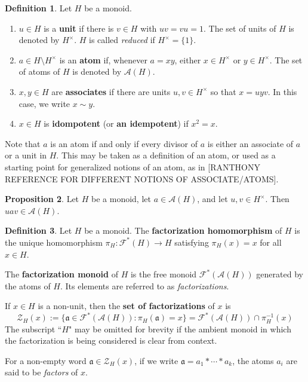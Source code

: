 \documentclass{report}
\newcommand{\A}{\mathscr{A}}
\renewcommand{\aa}{\mathfrak{a}}
\newcommand{\F}{\mathscr{F}}
\newcommand{\Z}{\mathcal{Z}}
\renewcommand{\:}{\text{:}}
\theoremstyle{definition}
\newtheorem{defn}{Definition}[section]
\newtheorem{prop}[defn]{Proposition}
\begin{document}
\begin{defn}
Let $H$ be a monoid.
\begin{enumerate}
\item $u\in H$ is a \textbf{unit} if there is $v\in H$ with $uv = vu = 1$.  
The set of units of $H$ is denoted by $H^\times$.  
$H$ is called \textit{reduced} if $H^\times = \{1\}$.
\item $a\in H\setminus H^\times$ is an \textbf{atom} if, whenever $a = xy$, either $x\in H^\times$ or $y\in H^\times$. The set of atoms of $H$ is denoted by $\A(H)$.
\item $x,y\in H$ are \textbf{associates} if there are units $u,v\in H^\times$ so that $x = uyv$. In this case, we write $x \sim y$.
\item $x\in H$ is \textbf{idompotent} (or \textbf{an idempotent}) if $x^2 = x$.
\end{enumerate}
\end{defn}

Note that $a$ is an atom if and only if every divisor of $a$ is either an associate of $a$ or a unit in $H$.
This may be taken as a definition of an atom, or used as a starting point for generalized notions of an atom, as in [RANTHONY REFERENCE FOR DIFFERENT NOTIONS OF ASSOCIATE/ATOMS].

\begin{prop}
Let $H$ be a monoid, let $a\in \A(H)$, and let $u,v\in H^\times$.
Then $uav \in \A(H)$.
\end{prop}

\begin{defn}
Let $H$ be a monoid.
The \textbf{factorization homomorphism} of $H$ is the unique homomorphism $\pi_H: \F^*(H) \to H$ satisfying $\pi_H(x) = x$ for all $x\in H$.

The \textbf{factorization monoid} of $H$ is the free monoid $\F^*(\A(H))$ generated by the atoms of $H$.
Its elements are referred to as \textit{factorizations}.

If $x\in H$ is a non-unit, then the \textbf{set of factorizations} of $x$ is
\[ \Z_H(x) := \{ \aa\in \F^*(\A(H)) : \pi_H(\aa) = x \} = \F^*(\A(H)) \cap \pi_H^{-1}(x) \]
The subscript ``$H$" may be omitted for brevity if the ambient monoid in which the factorization is being considered is clear from context.

For a non-empty word $\aa\in \Z_H(x)$, if we write $\aa = a_1*\cdots*a_k$, the atoms $a_i$ are said to be \textit{factors} of $x$.
\end{defn}
\end{document}
